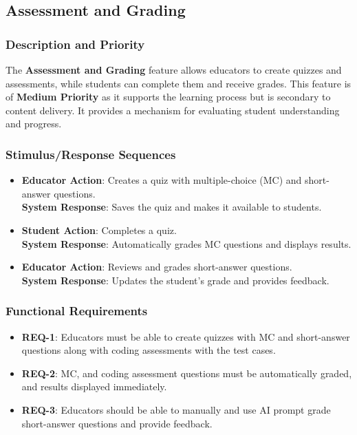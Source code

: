 \documentclass[a4paper, 11pt]{scrreprt}
\begin{document}
\subsection{Assessment and Grading}
\subsubsection{Description and Priority}
The \textbf{Assessment and Grading} feature allows educators to create quizzes and assessments, while students can complete them and receive grades. This feature is of \textbf{Medium Priority} as it supports the learning process but is secondary to content delivery. It provides a mechanism for evaluating student understanding and progress.

\subsubsection{Stimulus/Response Sequences}
\begin{itemize}
    \item \textbf{Educator Action}: Creates a quiz with multiple-choice (MC) and short-answer questions. \\
          \textbf{System Response}: Saves the quiz and makes it available to students.
    \item \textbf{Student Action}: Completes a quiz. \\
          \textbf{System Response}: Automatically grades MC questions and displays results.
    \item \textbf{Educator Action}: Reviews and grades short-answer questions. \\
          \textbf{System Response}: Updates the student’s grade and provides feedback.
\end{itemize}

\subsubsection{Functional Requirements}
\begin{itemize}
    \item \textbf{REQ-1}: Educators must be able to create quizzes with MC and short-answer questions along with coding assessments with the test cases.
    \item \textbf{REQ-2}: MC, and coding assessment questions must be automatically graded, and results displayed immediately.
    \item \textbf{REQ-3}: Educators should be able to manually and use AI prompt grade short-answer questions and provide feedback.
\end{itemize}
\end{document}
